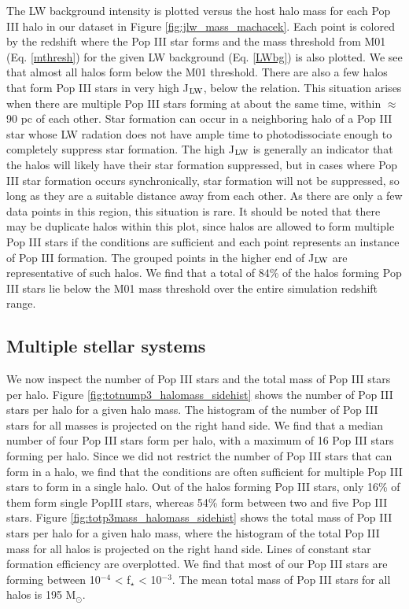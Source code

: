 \documentclass[a4paper,fleqn,usenatbib]{mnras}
\begin{document}
The LW background intensity is plotted versus the host halo mass for each Pop III halo in our dataset in Figure \ref{fig:jlw_mass_machacek}. Each point is colored by the redshift where the Pop III star forms and the mass threshold from M01 (Eq. \ref{mthresh}) for the given LW background (Eq. \ref{LWbg}) is also plotted. We see that almost all halos form below the M01 threshold. There are also a few halos that form Pop III stars in very high J$_{\rm LW}$, below the relation. This situation arises when there are multiple Pop III stars forming at about the same time, within $\approx$ 90 pc of each other. Star formation can occur in a neighboring halo of a Pop III star whose LW radation does not have ample time to photodissociate enough \hh{} to completely suppress star formation. The high J$_{\rm LW}$ is generally an indicator that the halos will likely have their star formation suppressed, but in cases where Pop III star formation occurs synchronically, star formation will not be suppressed, so long as they are a suitable distance away from each other. As there are only a few data points in this region, this situation is rare. It should be noted that there may be duplicate halos within this plot, since halos are allowed to form multiple Pop III stars if the conditions are sufficient and each point represents an instance of Pop III formation. The grouped points in the higher end of J$_{\rm LW}$ are representative of such halos. We find that a total of 84\% of the halos forming Pop III stars lie below the M01 mass threshold over the entire simulation redshift range. 

\subsection{Multiple stellar systems}

We now inspect the number of Pop III stars and the total mass of Pop III stars per halo. Figure \ref{fig:totnump3_halomass_sidehist} shows the number of Pop III stars per halo for a given halo mass. The histogram of the number of Pop III stars for all masses is projected on the right hand side. We find that a median number of four Pop III stars form per halo, with a maximum of 16 Pop III stars forming per halo. Since we did not restrict the number of Pop III stars that can form in a halo, we find that the conditions are often sufficient for multiple Pop III stars to form in a single halo. Out of the halos forming Pop III stars, only 16\% of them form single PopIII stars, whereas 54\% form between two and five Pop III stars. Figure \ref{fig:totp3mass_halomass_sidehist} shows the total mass of Pop III stars per halo for a given halo mass, where the histogram of the total Pop III mass for all halos is projected on the right hand side. Lines of constant star formation efficiency are overplotted. We find that most of our Pop III stars are forming between 10$^{-4}$ < f$_\star$ < 10$^{-3}$. The mean total mass of Pop III stars for all halos is 195 M$_{\odot}$.  
\end{document}

